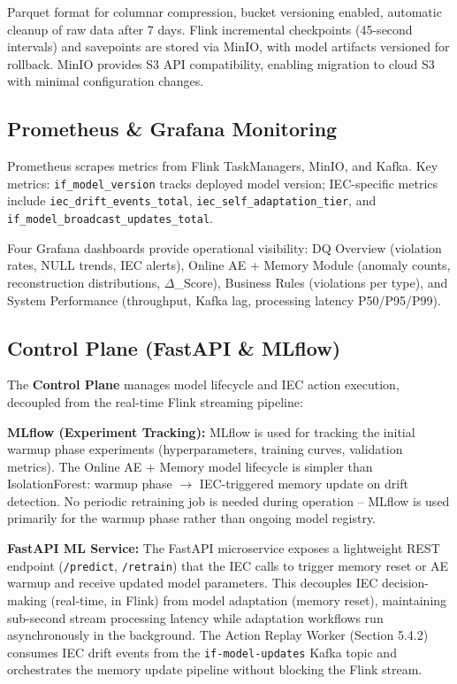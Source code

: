 Parquet format for columnar compression, bucket versioning enabled, automatic cleanup of raw data after 7 days. Flink incremental checkpoints (45-second intervals) and savepoints are stored via MinIO, with model artifacts versioned for rollback. MinIO provides S3 API compatibility, enabling migration to cloud S3 with minimal configuration changes.

\subsection{Prometheus \& Grafana Monitoring}

Prometheus scrapes metrics from Flink TaskManagers, MinIO, and Kafka. Key metrics: \texttt{if\_model\_version} tracks deployed model version; IEC-specific metrics include \texttt{iec\_drift\_events\_total}, \texttt{iec\_self\_adaptation\_tier}, and \texttt{if\_model\_broadcast\_updates\_total}.

Four Grafana dashboards provide operational visibility: DQ Overview (violation rates, NULL trends, IEC alerts), Online AE + Memory Module (anomaly counts, reconstruction distributions, $\Delta$\_Score), Business Rules (violations per type), and System Performance (throughput, Kafka lag, processing latency P50/P95/P99).

\subsection{Control Plane (FastAPI \& MLflow)}

The \textbf{Control Plane} manages model lifecycle and IEC action execution, decoupled from the real-time Flink streaming pipeline:

\textbf{MLflow (Experiment Tracking):} MLflow is used for tracking the initial warmup phase experiments (hyperparameters, training curves, validation metrics). The Online AE + Memory model lifecycle is simpler than IsolationForest: warmup phase $\rightarrow$ IEC-triggered memory update on drift detection. No periodic retraining job is needed during operation -- MLflow is used primarily for the warmup phase rather than ongoing model registry.

\textbf{FastAPI ML Service:} The FastAPI microservice exposes a lightweight REST endpoint (\texttt{/predict}, \texttt{/retrain}) that the IEC calls to trigger memory reset or AE warmup and receive updated model parameters. This decouples IEC decision-making (real-time, in Flink) from model adaptation (memory reset), maintaining sub-second stream processing latency while adaptation workflows run asynchronously in the background. The Action Replay Worker (Section 5.4.2) consumes IEC drift events from the \texttt{if-model-updates} Kafka topic and orchestrates the memory update pipeline without blocking the Flink stream.

